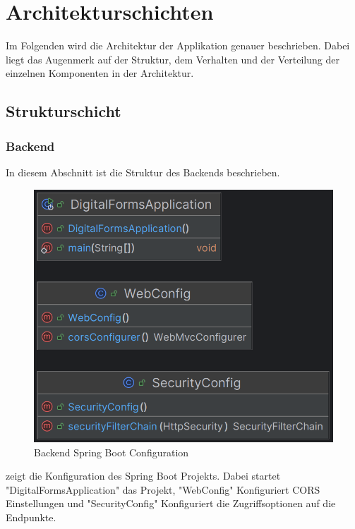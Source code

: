 \chapter{Architekturschichten}\label{ch:arrchitekturschichten}
Im Folgenden wird die Architektur der Applikation genauer beschrieben. Dabei liegt das Augenmerk 
auf der Struktur, dem Verhalten und der Verteilung der einzelnen Komponenten in der Architektur.


\section{Strukturschicht}\label{sec:strukturschicht}

\subsection{Backend}
In diesem Abschnitt ist die Struktur des Backends beschrieben.

\begin{figure}[H]
    \centering
    \includegraphics[width=15cm]{images/classDiagrams/Config}
    \caption{Backend Spring Boot Configuration}\label{fig:Backend-Spring-Boot-Configuration}
\end{figure}

 zeigt die Konfiguration des Spring Boot Projekts.
Dabei startet "DigitalFormsApplication" das Projekt, "WebConfig" Konfiguriert CORS Einstellungen und "SecurityConfig"
Konfiguriert die Zugriffsoptionen auf die Endpunkte.

